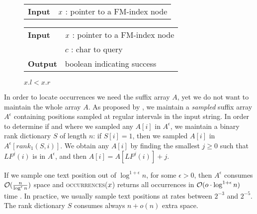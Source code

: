 \begin{figure*}
\begin{minipage}[t]{.5\textwidth}
\begin{algorithm}[H]
\begin{tabular}{ll}
\textbf{Input}  & $x$ : pointer to a FM-index node\\
\end{tabular}
\begin{algorithmic}[1]
\end{algorithmic}
\label{alg:fm-goroot}
\end{algorithm}
\end{minipage}
\hfill
\begin{minipage}[t]{.5\textwidth}
\begin{algorithm}[H]
\begin{tabular}{ll}
\textbf{Input}  & $x$ : pointer to a FM-index node\\
				& $c$ : char to query\\
\textbf{Output} & boolean indicating success\\
\end{tabular}
\begin{algorithmic}[1]
	\State \Return \False
\EndIf
{}
\State \Return $x.l < x.r$
\end{algorithmic}
\label{alg:fm-godownc}
\end{algorithm}
\end{minipage}
\end{figure*}

In order to locate occurrences we need the suffix array $A$, yet we do not want to maintain the whole array $A$.
As proposed by \citeauthor{Ferragina2000}, we maintain a \emph{sampled} suffix array $A^{\epsilon}$ containing positions sampled at regular intervals in the input string.
In order to determine if and where we sampled any $A[i]$ in $A^{\epsilon}$, we maintain a binary rank dictionary $S$ of length $n$: if $S[i]=1$, then we sampled $A[i]$ in $A^{\epsilon}[rank_1(S,i)]$.
We obtain any $A[i]$ by finding the smallest $j \geq 0$ such that $LF^j(i)$ is in $A^{\epsilon}$, and then $A[i] = A[LF^j(i)] + j$.

If we sample one text position out of $\log^{1+\epsilon}{n}$, for some $\epsilon > 0$, then $A^{\epsilon}$ consumes $\mathcal{O}(\frac{n}{\log^{\epsilon}{n}})$ space and \textsc{occurrences}($x$) returns all occurrences in $\mathcal{O}(o \cdot \log^{1+\epsilon}{n})$ time \citep{Ferragina2000}.
In practice, we usually sample text positions at rates between $2^{-3}$ and $2^{-5}$.
The rank dictionary $S$ consumes always $n+o(n)$ extra space.

